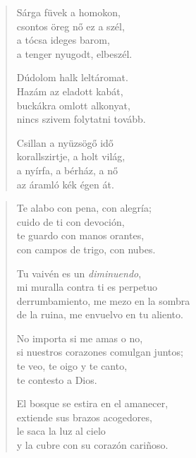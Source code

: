 \documentclass[11pt]{extbook}
\newcommand*{\centeredornament}{\centerline{\pgfornament[width=6cm]{88}}}
\begin{document}
\newpage

\vspace*{-15mm}
\centeredornament



\begin{verse}
  Sárga füvek a homokon, \\
  csontos öreg nő ez a szél, \\
  a tócsa ideges barom, \\
  a tenger nyugodt, elbeszél.

  Dúdolom halk leltáromat. \\
  Hazám az eladott kabát, \\
  buckákra omlott alkonyat, \\
  nincs szivem folytatni tovább.

  Csillan a nyüzsögő idő \\
  korallszirtje, a holt világ, \\
  a nyírfa, a bérház, a nő \\
  az áramló kék égen át.
\end{verse}

\newpage


\vspace*{-15mm}
\centeredornament



\begin{verse}
  Te alabo con pena, con alegría; \\
  cuido de ti con devoción, \\
  te guardo con manos orantes, \\
  con campos de trigo, con nubes.

  Tu vaivén es un \emph{diminuendo}, \\
  mi muralla contra ti es perpetuo \\
  derrumbamiento, me mezo en la sombra \\
  de la ruina, me envuelvo en tu aliento.

  No importa si me amas o no, \\
  si nuestros corazones comulgan juntos; \\
  te veo, te oigo y te canto, \\
  te contesto a Dios.

  El bosque se estira en el amanecer, \\
  extiende sus brazos acogedores, \\
  le saca la luz al cielo \\
  y la cubre con su corazón cariñoso.
\end{verse}
\end{document}

